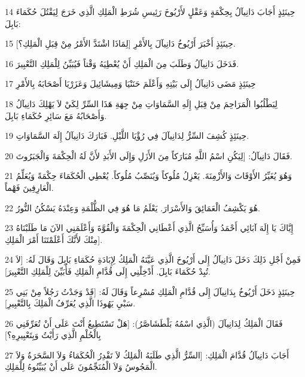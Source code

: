 \par 14 حِينَئِذٍ أَجَابَ دَانِيآلُ بِحِكْمَةٍ وَعَقْلٍ لأَرْيُوخَ رَئِيسِ شُرَطِ الْمَلِكِ الَّذِي خَرَجَ لِيَقْتُلَ حُكَمَاءَ بَابِلَ:
\par 15 [لِمَاذَا اشْتَدَّ الأَمْرُ مِنْ قِبَلِ الْمَلِكِ؟] حِينَئِذٍ أَخْبَرَ أَرْيُوخُ دَانِيآلَ بِالأَمْرِ.
\par 16 فَدَخَلَ دَانِيآلُ وَطَلَبَ مِنَ الْمَلِكِ أَنْ يُعْطِيَهُ وَقْتاً فَيُبَيِّنُ لِلْمَلِكِ التَّعْبِيرَ.
\par 17 حِينَئِذٍ مَضَى دَانِيآلُ إِلَى بَيْتِهِ وَأَعْلَمَ حَنَنْيَا وَمِيشَائِيلَ وَعَزَرْيَا أَصْحَابَهُ بِالأَمْرِ
\par 18 لِيَطْلُبُوا الْمَرَاحِمَ مِنْ قِبَلِ إِلَهِ السَّمَاوَاتِ مِنْ جِهَةِ هَذَا السِّرِّ لِكَيْ لاَ يَهْلِكَ دَانِيآلُ وَأَصْحَابُهُ مَعَ سَائِرِ حُكَمَاءِ بَابِلَ.
\par 19 حِينَئِذٍ كُشِفَ السِّرُّ لِدَانِيآلَ فِي رُؤْيَا اللَّيْلِ. فَبَارَكَ دَانِيآلُ إِلَهَ السَّمَاوَاتِ.
\par 20 فَقَالَ دَانِيآلُ: [لِيَكُنِ اسْمُ اللَّهِ مُبَارَكاً مِنَ الأَزَلِ وَإِلَى الأَبَدِ لأَنَّ لَهُ الْحِكْمَةَ وَالْجَبَرُوتَ.
\par 21 وَهُوَ يُغَيِّرُ الأَوْقَاتَ وَالأَزْمِنَةَ. يَعْزِلُ مُلُوكاً وَيُنَصِّبُ مُلُوكاً. يُعْطِي الْحُكَمَاءَ حِكْمَةً وَيُعَلِّمُ الْعَارِفِينَ فَهْماً.
\par 22 هُوَ يَكْشِفُ الْعَمَائِقَ وَالأَسْرَارَ. يَعْلَمُ مَا هُوَ فِي الظُّلْمَةِ وَعِنْدَهُ يَسْكُنُ النُّورُ.
\par 23 إِيَّاكَ يَا إِلَهَ آبَائِي أَحْمَدُ وَأُسَبِّحُ الَّذِي أَعْطَانِي الْحِكْمَةَ وَالْقُوَّةَ وَأَعْلَمَنِي الآنَ مَا طَلَبْنَاهُ مِنْكَ لأَنَّكَ أَعْلَمْتَنَا أَمْرَ الْمَلِكِ].
\par 24 فَمِنْ أَجْلِ ذَلِكَ دَخَلَ دَانِيآلُ إِلَى أَرْيُوخَ الَّذِي عَيَّنَهُ الْمَلِكُ لِإِبَادَةِ حُكَمَاءِ بَابِلَ وَقَالَ لَهُ: [لاَ تُبِدْ حُكَمَاءَ بَابِلَ. أَدْخِلْنِي إِلَى قُدَّامِ الْمَلِكِ فَأُبَيِّنَ لِلْمَلِكِ التَّعْبِيرَ].
\par 25 حِينَئِذٍ دَخَلَ أَرْيُوخُ بِدَانِيآلَ إِلَى قُدَّامِ الْمَلِكِ مُسْرِعاً وَقَالَ لَهُ: [قَدْ وَجَدْتُ رَجُلاً مِنْ بَنِي سَبْيِ يَهُوذَا الَّذِي يُعَرِّفُ الْمَلِكَ بِالتَّعْبِيرِ].
\par 26 فَقَالَ الْمَلِكُ لِدَانِيآلَ (الَّذِي اسْمُهُ بَلْطَشَاصَّرُ): [هَلْ تَسْتَطِيعُ أَنْتَ عَلَى أَنْ تُعَرِّفَنِي بِالْحُلْمِ الَّذِي رَأَيْتُ وَبِتَعْبِيرِهِ؟]
\par 27 أَجَابَ دَانِيآلُ قُدَّامَ الْمَلِكِ: [السِّرُّ الَّذِي طَلَبَهُ الْمَلِكُ لاَ تَقْدِرُ الْحُكَمَاءُ وَلاَ السَّحَرَةُ وَلاَ الْمَجُوسُ وَلاَ الْمُنَجِّمُونَ عَلَى أَنْ يُبَيِّنُوهُ لِلْمَلِكِ.
